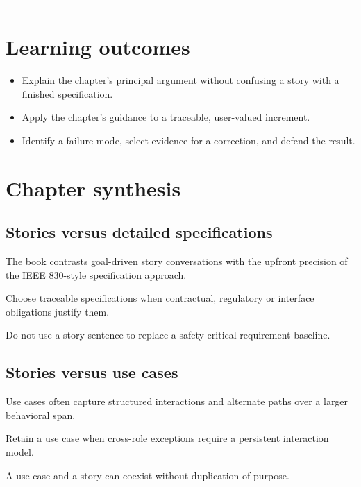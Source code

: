 \documentclass[11pt,letterpaper]{article}
\begin{document}
\tableofcontents\medskip\noindent\rule{\linewidth}{0.4pt}\medskip
\section{Learning outcomes}
\begin{itemize}[leftmargin=*,itemsep=2pt]
\item Explain the chapter's principal argument without confusing a story with a finished specification.
\item Apply the chapter's guidance to a traceable, user-valued increment.
\item Identify a failure mode, select evidence for a correction, and defend the result.
\end{itemize}
\section{Chapter synthesis}
\subsection{Stories versus detailed specifications}
The book contrasts goal-driven story conversations with the upfront precision of the IEEE 830-style specification approach.

\begin{tcolorbox}[colback=tealback,colframe=navy,title={Engineering translation},breakable]
Choose traceable specifications when contractual, regulatory or interface obligations justify them.

\end{tcolorbox}
\begin{tcolorbox}[colback=amberback,colframe=navy,title={Failure mode to watch},breakable]
Do not use a story sentence to replace a safety-critical requirement baseline.

\end{tcolorbox}
\subsection{Stories versus use cases}
Use cases often capture structured interactions and alternate paths over a larger behavioral span.

\begin{tcolorbox}[colback=tealback,colframe=navy,title={Engineering translation},breakable]
Retain a use case when cross-role exceptions require a persistent interaction model.

\end{tcolorbox}
\begin{tcolorbox}[colback=amberback,colframe=navy,title={Failure mode to watch},breakable]
A use case and a story can coexist without duplication of purpose.

\end{tcolorbox}
\end{document}
